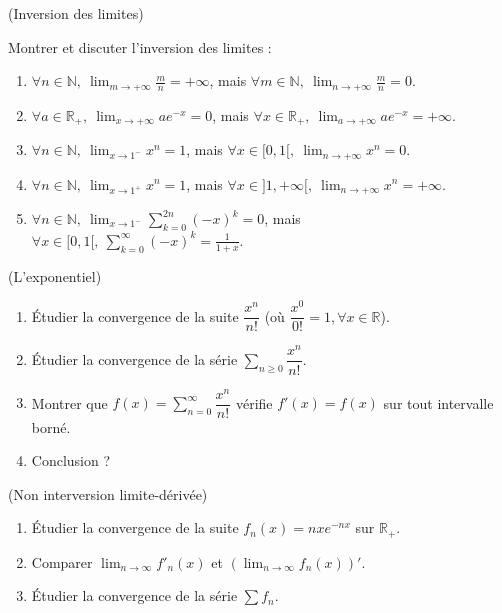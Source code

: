\documentclass[a4paper,11pt,reqno]{amsart}
\begin{document}


\begin{exo} (Inversion des limites)

  Montrer et discuter l'inversion des limites :
  \begin{enumerate}
    \item
      $\forall n \in \mathbb{N},\ \lim_{m \to +\infty} \frac{m}{n}= +\infty$, mais
      $\forall m \in \mathbb{N},\ \lim_{n \to +\infty} \frac{m}{n}= 0$.
    \item
      $\forall a \in \mathbb{R}_{+},\ \lim_{x\to+\infty} ae^{−x} = 0$, mais
      $\forall x \in \mathbb{R}_{+},\ \lim_{a\to+\infty} ae^{−x} = +\infty$.
    \item
      $\forall n \in \mathbb{N},\ \lim_{x\to 1^{−}} x^{n} = 1$, mais
      $\forall x \in [0, 1[,\ \lim_{n\to +\infty} x^{n} = 0$.
    \item
      $\forall n \in \mathbb{N},\ \lim_{x\to 1^{+}} x^{n} = 1$, mais
      $\forall x \in]1, +\infty[,\ \lim_{n\to +\infty} x^{n} = +\infty $.
    \item
      $\forall n \in \mathbb{N},\ \lim_{x\to 1^{−}} \sum_{k=0}^{2n} (−x)^{k} = 0$, mais
      $\forall x \in [0, 1[,\ \sum_{k=0}^{\infty} (−x)^{k} = \frac{1}{1 + x}$.
  \end{enumerate}

\end{exo}

\begin{exo} (L'exponentiel)

  \begin{enumerate}
    \item Étudier la convergence de la suite $\dfrac{x^{n}}{n!}$ (où $\dfrac{x^{0}}{0!}=1, \forall x \in \mathbb{R}$).
    \item Étudier la convergence de la série $\sum_{n \geq 0}\dfrac{x^{n}}{n!}$.
    \item Montrer que $f(x)=\sum_{n = 0}^{\infty}\dfrac{x^{n}}{n!}$ vérifie $f'(x)=f(x)$ sur tout intervalle borné.
    \item Conclusion ?
  \end{enumerate}
\end{exo}

\begin{exo} (Non interversion limite-dérivée)

  \begin{enumerate}
    \item Étudier la convergence de la suite $f_{n}(x)=nxe^{-nx}$ sur $\mathbb{R}_{+}$.
    \item Comparer $\lim_{n\to\infty} f'_{n}(x)$ et $\left(\lim_{n\to\infty} f_{n}(x)\right)'$.
    \item Étudier la convergence de la série $\sum f_{n}$.
  \end{enumerate}
\end{exo}
\end{document}
